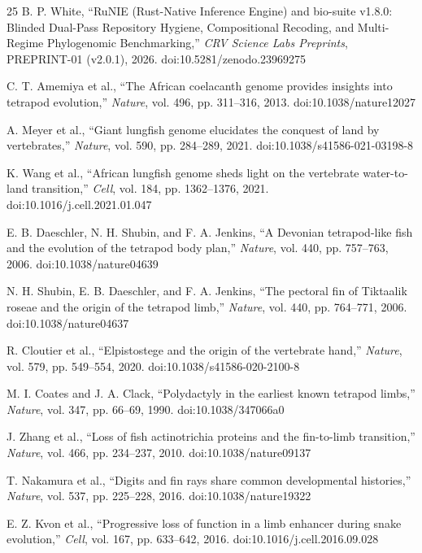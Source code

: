 \documentclass[10pt,letterpaper]{article}
\begin{document}
\begin{thebibliography}{25}
B. P. White, ``RuNIE (Rust-Native Inference Engine) and bio-suite v1.8.0: Blinded Dual-Pass Repository Hygiene, Compositional Recoding, and Multi-Regime Phylogenomic Benchmarking,'' \emph{CRV Science Labs Preprints}, PREPRINT-01 (v2.0.1), 2026. doi:10.5281/zenodo.23969275

C. T. Amemiya et al., ``The African coelacanth genome provides insights into tetrapod evolution,'' \emph{Nature}, vol. 496, pp. 311--316, 2013. doi:10.1038/nature12027

A. Meyer et al., ``Giant lungfish genome elucidates the conquest of land by vertebrates,'' \emph{Nature}, vol. 590, pp. 284--289, 2021. doi:10.1038/s41586-021-03198-8

K. Wang et al., ``African lungfish genome sheds light on the vertebrate water-to-land transition,'' \emph{Cell}, vol. 184, pp. 1362--1376, 2021. doi:10.1016/j.cell.2021.01.047

E. B. Daeschler, N. H. Shubin, and F. A. Jenkins, ``A Devonian tetrapod-like fish and the evolution of the tetrapod body plan,'' \emph{Nature}, vol. 440, pp. 757--763, 2006. doi:10.1038/nature04639

N. H. Shubin, E. B. Daeschler, and F. A. Jenkins, ``The pectoral fin of Tiktaalik roseae and the origin of the tetrapod limb,'' \emph{Nature}, vol. 440, pp. 764--771, 2006. doi:10.1038/nature04637

R. Cloutier et al., ``Elpistostege and the origin of the vertebrate hand,'' \emph{Nature}, vol. 579, pp. 549--554, 2020. doi:10.1038/s41586-020-2100-8

M. I. Coates and J. A. Clack, ``Polydactyly in the earliest known tetrapod limbs,'' \emph{Nature}, vol. 347, pp. 66--69, 1990. doi:10.1038/347066a0

J. Zhang et al., ``Loss of fish actinotrichia proteins and the fin-to-limb transition,'' \emph{Nature}, vol. 466, pp. 234--237, 2010. doi:10.1038/nature09137

T. Nakamura et al., ``Digits and fin rays share common developmental histories,'' \emph{Nature}, vol. 537, pp. 225--228, 2016. doi:10.1038/nature19322

E. Z. Kvon et al., ``Progressive loss of function in a limb enhancer during snake evolution,'' \emph{Cell}, vol. 167, pp. 633--642, 2016. doi:10.1016/j.cell.2016.09.028


\end{thebibliography}
\end{document}
